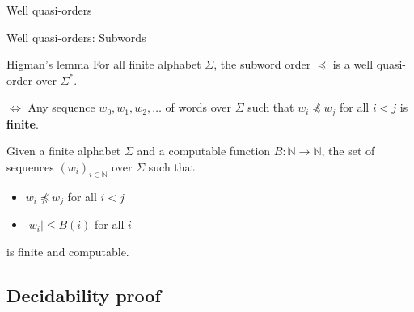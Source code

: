 \documentclass{beamer}
\begin{document}
\begin{frame}{Well quasi-orders}
		 
	
		
		




%	
	
\end{frame}


\begin{frame}{Well quasi-orders: Subwords}
	
	\begin{block}{Higman's lemma}
		For all finite alphabet $\Sigma$, the subword order $\preceq$ is a well quasi-order over $\Sigma^*$.
	\end{block}

	\pause
	$\Leftrightarrow$ Any sequence $w_0, w_1, w_2, \ldots$ of words over $\Sigma$ such that $w_i \npreceq w_j$ for all $i<j$ is \textbf{finite}.
	
	\vspace{1cm}
	\pause
	Given a finite alphabet $\Sigma$ and a computable function $B : \mathbb{N} \to \mathbb{N}$, the set of sequences $(w_i)_{i \in \mathbb{N}}$ over $\Sigma$ such that
	\begin{itemize}
		\item $w_i \npreceq w_j$ for all $i<j$ 
		\item $|w_i| \leq B(i)$ for all $i$
	\end{itemize}
is finite and computable.
\end{frame}

\subsection{Decidability proof}
\end{document}
